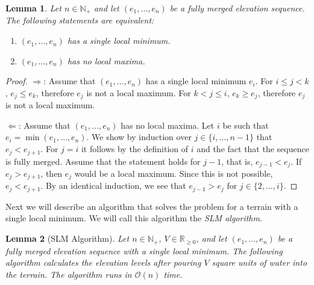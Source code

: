 \documentclass[11pt,a4paper]{article}
\newtheorem{lem}{Lemma}
\newcommand{\Np}{\mathbb{N}_+}
\newcommand{\bO}{\mathcal{O}}
\newcommand{\Rnn}{\mathbb{R}_{\ge0}}
\begin{document}
\begin{lem}
  \label{localmin}
  Let $n\in\Np$ and let $(e_1,\ldots,e_n)$ be a fully merged elevation sequence.
  The following statements are equivalent:
  \begin{enumerate}
    \item $(e_1,\ldots,e_n)$ has a single local minimum.
    \item $(e_1,\ldots,e_n)$ has no local maxima.
  \end{enumerate}
\end{lem}

\begin{proof}
  $\Rightarrow$: Assume that $(e_1,\ldots,e_n)$ has a single local minimum $e_i$.
  For $i \le j < k$, $e_j \le e_k$, therefore $e_j$ is not a local maximum.
  For $k < j \le i$, $e_k \ge e_j$, therefore $e_j$ is not a local maximum.

  $\Leftarrow$: Assume that $(e_1,\ldots,e_n)$ has no local maxima.
  Let $i$ be such that $e_i = \min(e_1,\ldots,e_n)$.
  We show by induction over $j \in \{i,\ldots,n-1\}$ that $e_j < e_{j+1}$.
  For $j = i$ it follows by the definition of $i$ and the fact that the sequence is fully merged.
  Assume that the statement holds for $j-1$, that is, $e_{j-1} < e_j$.
  If $e_j > e_{j+1}$, then $e_j$ would be a local maximum.
  Since this is not possible, $e_j < e_{j+1}$.
  By an identical induction, we see that $e_{j-1} > e_j$ for $j \in \{2,\ldots,i\}$.
\end{proof}

Next we will describe an algorithm that solves the problem for a terrain with a single local minimum.
We will call this algorithm the \textit{SLM algorithm}.

\begin{lem}[SLM Algorithm]
    \label{alg1}
    Let $n\in\Np$, $V\in\Rnn$, and let $(e_1,\ldots,e_n)$ be a fully merged elevation sequence with a single local minimum.
    The following algorithm calculates the elevation levels after pouring $V$ square units of water into the terrain.
    The algorithm runs in $\bO(n)$ time.
\end{lem}

\vspace{1em}
\end{document}
